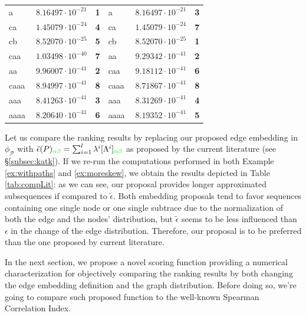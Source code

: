 \begin{table}[!t]
\begin{tabular}{lc|l||lc|l}
	a & $\;8.16497\cdot10^{-21}$ & \textbf{\color{blue}1} & a & $\;8.16497\cdot 10^{-21}$ & \textbf{\color{red}3} \\
	ca & $\;1.45079\cdot10^{-24}$ & \textbf{\color{blue}4} & ca &  $\;1.45079\cdot 10^{-24}$ & \textbf{\color{red}7}\\
	cb & $\;8.52070\cdot10^{-25}$ & \textbf{\color{blue}5} & cb & $\;8.52070\cdot10^{-25}$& \textbf{\color{blue}1}\\
	caa & $\;1.03498\cdot10^{-40}$ & \textbf{\color{blue}7} & aa & $\;9.29342\cdot10^{-41}$ & \textbf{\color{blue}2}\\
	aa & $\;9.96007\cdot10^{-41}$ & \textbf{\color{red}2} & caa & $\;9.18112\cdot10^{-41}$ & \textbf{\color{blue}6}\\
	caaa & $\;8.94997\cdot10^{-41}$ & \textbf{\color{red}8} & caaa & $\;8.71867\cdot10^{-41}$ & \textbf{\color{blue}8}\\
	aaa & $\;8.41263\cdot10^{-41}$ &  \textbf{\color{red}3} & aaa & $\;8.31269\cdot10^{-41}$ & \textbf{\color{red}4}\\
	aaaa & $\;8.20640\cdot10^{-41}$ &  \textbf{\color{red}6} & aaaa & $\;8.19352\cdot10^{-41}$ & \textbf{\color{red}5}\\
	
	\bottomrule
\end{tabular}
\end{table}

\begin{example}\label{ex:cmpexample}
Let us compare the ranking results by replacing our proposed edge embedding in $\phi_{\mathcal{P}}$ with $\tilde{\epsilon}(P)_{\color{green}\alpha\beta}=\sum_{i=1}^l\lambda^i[\Lambda^i]_{\color{green}\alpha\beta}$ as proposed by the current literature (see \S\ref{subsec:katk}). If we re-run the computations performed in both Example \ref{ex:withpaths} and \ref{ex:moreskew}, we obtain the results depicted in Table \ref{tab:compLit}: as we can see, our proposal provides longer approximated subsequences if compared to $\tilde{\epsilon}$. Both embedding proposals tend to favor sequences containing one single node or one single subtrace due to the normalization of both  the edge and the nodes' distribution, but $\tilde{\epsilon}$ seems to be less influenced than $\epsilon$ in the change of the edge distribution. Therefore, our proposal is to be preferred than the one proposed by current literature.
\end{example}

In the next section, we propose a novel scoring function providing a numerical characterization for objectively comparing the ranking results by both changing the edge embedding definition and the graph distribution. Before doing so, we're going to compare such proposed function to the well-known Spearman Correlation Index.